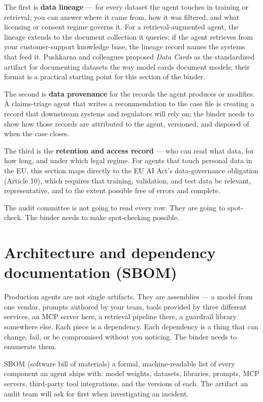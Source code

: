 The first is \textbf{data lineage} --- for every dataset the agent touches in training or retrieval, you can answer where it came from, how it was filtered, and what licensing or consent regime governs it. For a retrieval-augmented agent, the lineage extends to the document collection it queries; if the agent retrieves from your customer-support knowledge base, the lineage record names the systems that feed it. Pushkarna and colleagues \citep{pushkarna2022datacards} proposed \textit{Data Cards} as the standardized artifact for documenting datasets the way model cards document models; their format is a practical starting point for this section of the binder.

The second is \textbf{data provenance} for the records the agent produces or modifies. A claims-triage agent that writes a recommendation to the case file is creating a record that downstream systems and regulators will rely on; the binder needs to show how those records are attributed to the agent, versioned, and disposed of when the case closes.

The third is the \textbf{retention and access record} --- who can read what data, for how long, and under which legal regime. For agents that touch personal data in the EU, this section maps directly to the EU AI Act's data-governance obligation (Article 10), which requires that training, validation, and test data be relevant, representative, and to the extent possible free of errors and complete.

The audit committee is not going to read every row. They are going to spot-check. The binder needs to make spot-checking possible.

\section{Architecture and dependency documentation (SBOM)}

Production agents are not single artifacts. They are assemblies --- a model from one vendor, prompts authored by your team, tools provided by three different services, an MCP server here, a retrieval pipeline there, a guardrail library somewhere else. Each piece is a dependency. Each dependency is a thing that can change, fail, or be compromised without you noticing. The binder needs to enumerate them.

\begin{TNdefinition}{SBOM (software bill of materials)} a formal, machine-readable list of every component an agent ships with: model weights, datasets, libraries, prompts, MCP servers, third-party tool integrations, and the versions of each. The artifact an audit team will ask for first when investigating an incident. \end{TNdefinition}

